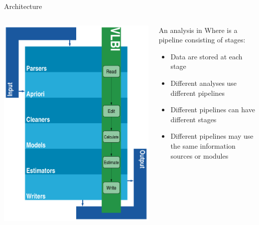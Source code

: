 \documentclass[14pt,c]{beamer}
\begin{document}
\begin{frame}{Architecture}
  \begin{columns}
    \begin{column}[c]{0.44\textwidth}
      \includegraphics[width=\textwidth]{figure/code_structure_vlbi}
    \end{column}

    \begin{column}[c]{0.55\textwidth}
      An analysis in Where is a pipeline consisting of stages:

      \begin{small}
      \begin{itemize}
      \item Data are stored at each stage
      \item Different analyses use different pipelines
      \item Different pipelines can have different stages
      \item Different pipelines may use the same information sources or modules
      \end{itemize}
      \end{small}
    \end{column}
  \end{columns}
\end{frame}
\end{document}
